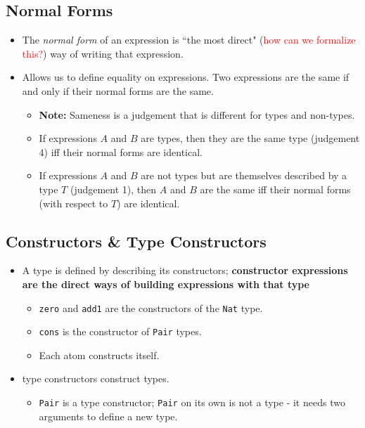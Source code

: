 \documentclass{article}
\newcommand{\ttt}[1]{\texttt{#1}}
\begin{document}
\subsection{Normal Forms}
\begin{itemize}
    \item The \textit{normal form} of an expression is ``the most direct" (\textcolor{red}{how can we formalize this?}) way of writing that expression.
    \item Allows us to define equality on expressions. Two expressions are the same if and only if their normal forms are the same.
        \begin{itemize}
            \item \textbf{Note:} Sameness is a judgement that is different for types and non-types.
            \item If expressions \(A\) and \(B\) are types, then they are the same type (judgement 4) iff their normal forms are identical.
            \item If expressions \(A\) and \(B\) are not types but are themselves described by a type \(T\) (judgement 1), then \(A\) and \(B\) are the same iff their normal forms (with respect to \(T\)) are identical.
        \end{itemize}
\end{itemize}

\subsection{Constructors \& Type Constructors}
\begin{itemize}
    \item A type is defined by describing its constructors; \textbf{constructor expressions are the direct ways of building expressions with that type}
        \begin{itemize}
            \item \ttt{zero} and \ttt{add1} are the constructors of the \ttt{Nat} type.
            \item \ttt{cons} is the constructor of \ttt{Pair} types.
            \item Each atom constructs itself.
        \end{itemize}
    \item type constructors construct types.
        \begin{itemize}
            \item \ttt{Pair} is a type constructor; \ttt{Pair} on its own is not a type - it needs two arguments to define a new type.
        \end{itemize}
\end{itemize}
\end{document}
